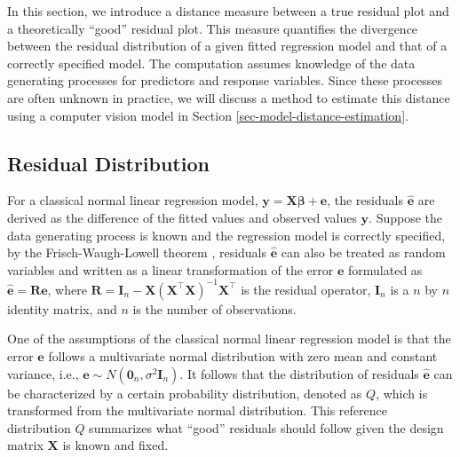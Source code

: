 \documentclass[]{interact}
\theoremstyle{plain}%
\theoremstyle{definition}
\theoremstyle{remark}
\begin{document}
In this section, we introduce a distance measure between a true residual
plot and a theoretically ``good'' residual plot. This measure quantifies
the divergence between the residual distribution of a given fitted
regression model and that of a correctly specified model. The
computation assumes knowledge of the data generating processes for
predictors and response variables. Since these processes are often
unknown in practice, we will discuss a method to estimate this distance
using a computer vision model in Section
\ref{sec-model-distance-estimation}.

\subsection{Residual Distribution}\label{residual-distribution}

For a classical normal linear regression model,
\(\boldsymbol{y} = \boldsymbol{X}\boldsymbol{\beta} + \boldsymbol{e}\),
the residuals \(\hat{\boldsymbol{e}}\) are derived as the difference of
the fitted values and observed values \(\boldsymbol{y}\). Suppose the
data generating process is known and the regression model is correctly
specified, by the Frisch-Waugh-Lowell theorem \citep{frisch1933partial},
residuals \(\hat{\boldsymbol{e}}\) can also be treated as random
variables and written as a linear transformation of the error
\(\boldsymbol{e}\) formulated as
\(\hat{\boldsymbol{e}} = \boldsymbol{R}\boldsymbol{e}\), where
\(\boldsymbol{R}=\boldsymbol{I}_n -\boldsymbol{X}(\boldsymbol{X}^\top\boldsymbol{X})^{-1}\boldsymbol{X}^\top\)
is the residual operator, \(\boldsymbol{I}_n\) is a \(n\) by \(n\)
identity matrix, and \(n\) is the number of observations.

One of the assumptions of the classical normal linear regression model
is that the error \(\boldsymbol{e}\) follows a multivariate normal
distribution with zero mean and constant variance, i.e.,
\(\boldsymbol{e} \sim N(\boldsymbol{0}_n,\sigma^2\boldsymbol{I}_n)\). It
follows that the distribution of residuals \(\hat{\boldsymbol{e}}\) can
be characterized by a certain probability distribution, denoted as
\(Q\), which is transformed from the multivariate normal distribution.
This reference distribution \(Q\) summarizes what ``good'' residuals
should follow given the design matrix \(\boldsymbol{X}\) is known and
fixed.
\end{document}
